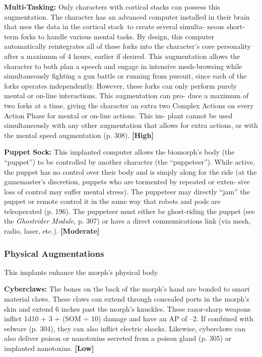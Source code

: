 \textbf{Multi-Tasking:} Only characters with cortical stacks 
can possess this augmentation. The character has an 
advanced computer installed in their brain that uses 
the data in the cortical stack to create several simulta-
neous short-term forks to handle various mental tasks. 
By design, this computer automatically reintegrates 
all of these forks into the character's core personality 
after a maximum of 4 hours, earlier if desired. This 
augmentation allows the character to both plan a 
speech and engage in intensive mesh-browsing while 
simultaneously fighting a gun battle or running from 
pursuit, since each of the forks operates independently. 
However, these forks can only perform purely mental 
or on-line interactions. This augmentation can pro-
duce a maximum of two forks at a time, giving the 
character an extra two Complex Actions on every 
Action Phase for mental or on-line actions. This im-
plant cannot be used simultaneously with any other 
augmentation that allows for extra actions, or with 
the mental speed augmentation (p. 308). \textbf{[High]}

\textbf{Puppet Sock:} This implanted computer allows the 
biomorph's body (the ``puppet'') to be controlled by 
another character (the ``puppeteer''). While active, the 
puppet has no control over their body and is simply 
along for the ride (at the gamemaster's discretion, 
puppets who are tormented by repeated or exten-
sive loss of control may suffer mental stress). The 
puppeteer may directly ``jam'' the puppet or remote 
control it in the same way that robots and pods are 
teleoperated (p. 196). The puppeteer must either be 
ghost-riding the puppet (see the \textit{Ghostrider Module,} p. 
307) or have a direct communications link (via mesh, 
radio, laser, etc.). \textbf{[Moderate]}

\subsubsection{Physical Augmentations}

This implants enhance the morph's physical body.

\textbf{Cyberclaws: }The bones on the back of the morph's 
hand are bonded to smart material claws. These claws 
can extend through concealed ports in the morph's 
skin and extend 6 inches past the morph's knuckles. 
These razor-sharp weapons inflict 1d10 + 3 + (SOM 
÷ 10) damage and have an AP of –2. If combined 
with eelware (p. 304), they can also inflict  electric 
shocks. Likewise, cyberclaws can also deliver poison 
or nanotoxins secreted from a poison gland (p. 305) 
or implanted nanotoxins. \textbf{[Low]}

